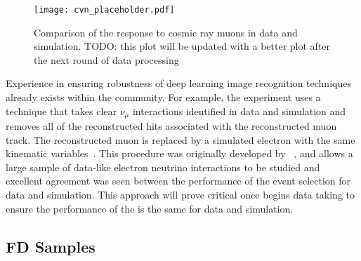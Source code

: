 \begin{figure}
    \centering
    \texttt{[image: cvn\_placeholder.pdf]}
    \caption{Comparison of the  response to cosmic ray muons in  data and simulation. TODO: this plot will be updated with a better plot after the next round of  data processing}
    \label{fig:protodunecvn}
\end{figure}

Experience in ensuring robustness of deep learning image recognition techniques already exists within the community. For example, the  experiment uses a technique that takes clear $\nu_\mu$ interactions identified in data and simulation and removes all of the reconstructed hits associated with the reconstructed muon track. The reconstructed muon is replaced by a simulated electron with the same kinematic variables~\cite{NOvA_MRE}. This procedure was originally developed by ~\cite{MINOS_MRE}, and allows a large sample of data-like electron neutrino interactions to be studied and excellent agreement was seen between the performance of the event selection for data and simulation. This approach will prove critical once  begins data taking to ensure the performance of the  is the same for data and simulation.
\subsection{FD Samples}

